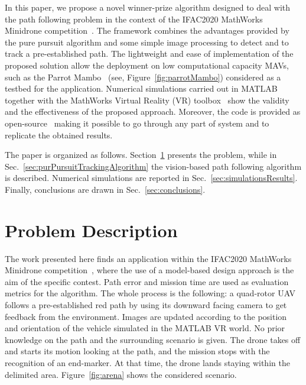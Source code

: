 \documentclass[a4paper,twocolumn,10pt]{article}
\begin{document}
    In this paper, we propose a novel winner-prize algorithm designed to deal with the path following 
    problem in the context of the IFAC2020 MathWorks Minidrone competition~\cite{4_Mathworks_url}. The 
    framework combines the advantages provided by the pure pursuit algorithm and some simple image 
    processing to detect and to track a pre-established path. The lightweight and ease of 
    implementation of the proposed solution allow the deployment on low computational 
    capacity MAVs, such as the Parrot Mambo~\cite{15_Mathworks_url} (see, 
    Figure~\ref{fig:parrotMambo}) considered as a testbed for the application. Numerical simulations 
    carried out in MATLAB together with the MathWorks Virtual Reality (VR) toolbox~\cite{SilanoMATFly} show the 
    validity and the effectiveness of the proposed approach. Moreover, the code is provided as 
    open-source~\cite{GitHubCode} making it possible to go through any part of system and to replicate 
    the obtained results. 

    The paper is organized as follows. Section~\ref{sec:problemDescription} presents the problem, while 
    in Sec.~\ref{sec:purPursuitTrackingAlgorithm} the vision-based path following algorithm is 
    described. Numerical simulations are reported in Sec.~\ref{sec:simulationsResults}. Finally, 
    conclusions are drawn in Sec.~\ref{sec:conclusions}. 

    \section{Problem Description}
    \label{sec:problemDescription}

    The work presented here finds an application within the IFAC2020 MathWorks Minidrone 
    competition~\cite{4_Mathworks_url}, where the use of a model-based design approach is the aim of 
    the specific contest. Path error and mission time are used as evaluation metrics for the algorithm. 
    The whole process is the following: a quad-rotor UAV follows a pre-established red path by 
    using its downward facing camera to get feedback from the environment. Images are updated according 
    to the position and orientation of the vehicle simulated in the MATLAB VR world. No prior 
    knowledge on the path and the surrounding scenario is given. The drone takes off and starts its 
    motion looking at the path, and the mission stops with the recognition of an end-marker. At that 
    time, the drone lands staying within the delimited area. Figure~\ref{fig:arena} shows the 
    considered scenario. 
\end{document}
